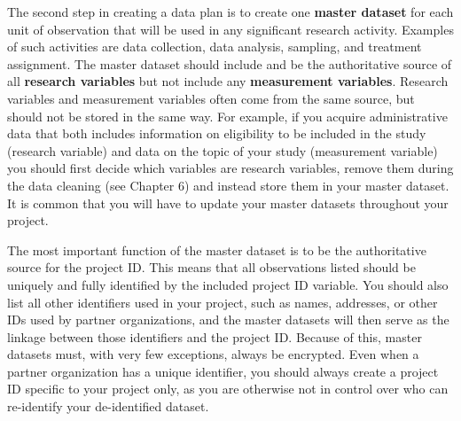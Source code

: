 The second step in creating a data plan is to create one \textbf{master dataset}
for each unit of observation
that will be used in any significant research activity.
Examples of such activities are data collection, data analysis,
sampling, and treatment assignment.
The master dataset should include and be the authoritative source of
all \textbf{research variables}
but not include any \textbf{measurement variables}.
Research variables and measurement variables
often come from the same source,
but should not be stored in the same way.
For example, if you acquire administrative data that both includes
information on eligibility to be included in the study (research variable)
and data on the topic of your study (measurement variable)
you should first decide which variables are research variables,
remove them during the data cleaning (see Chapter 6)
and instead store them in your master dataset.
It is common that you will have to update
your master datasets throughout your project.

The most important function of the master dataset
is to be the authoritative source for the project ID.
This means that all observations listed
should be uniquely and fully identified by the included project ID variable.
You should also list all other identifiers used in your project,
such as names, addresses, or other IDs used by partner organizations,
and the master datasets will then serve as
the linkage between those identifiers and the project ID.
Because of this, master datasets must,
with very few exceptions, always be encrypted.
Even when a partner organization has a unique identifier,
you should always create a project ID specific to your project only,
as you are otherwise not in control over
who can re-identify your de-identified dataset.

